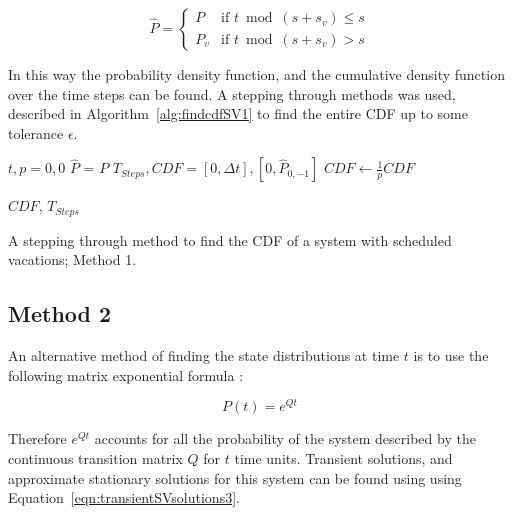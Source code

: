 \documentclass{article}
\begin{document}
\begin{equation}\label{eqn:transientSVsolutions2}
\hat{P} = \left\{
    \begin{array}{cc}
    P & \text{if } t \bmod (s + s_v) \leq s \\
    P_v & \text{if } t \bmod (s + s_v) > s
    \end{array}\right.
\end{equation}

In this way the probability density function, and the cumulative density function over the time steps can be found.
A stepping through methods was used, described in Algorithm~\ref{alg:findcdfSV1} to find the entire CDF up to some tolerance $\epsilon$.

\begin{algorithm}[!hbtp]
\DontPrintSemicolon
{}

\BlankLine

$t, p = 0, 0$\;
$\hat{P}$ = $P$\;
$T_{Steps}, CDF = [0, \Delta t], [0, \hat{P}_{0, -1}]$\;
$CDF \leftarrow \frac{1}{p}CDF$\;
\BlankLine

\KwRet $CDF$, $T_{Steps}$
\caption{A stepping through method to find the CDF of a system with scheduled vacations; Method 1.}
\label{alg:findcdfSV1}
\end{algorithm}


\subsection{Method 2}\label{sec:method2}

An alternative method of finding the state distributions at time $t$ is to use the following matrix exponential formula \cite{stewart09}:

\begin{equation}
P(t) = e^{Qt}
\end{equation}

Therefore $e^{Qt}$ accounts for all the probability of the system described by the continuous transition matrix $Q$ for $t$ time units.
Transient solutions, and approximate stationary solutions for this system can be found using using Equation~\ref{eqn:transientSVsolutions3}.
\end{document}
